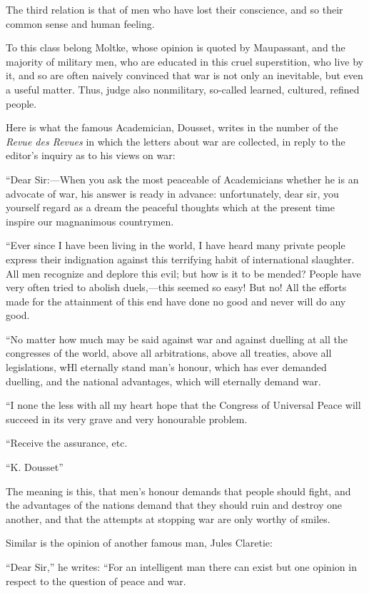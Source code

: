 \documentclass{book}
\begin{document}
The third relation is that of men who have lost their conscience, and so their common sense and human feeling.

To this class belong Moltke, whose opinion is quoted by Maupassant, and the majority of military men, who are educated in this cruel superstition, who live by it, and so are often naively convinced that war is not only an inevitable, but even a useful matter. Thus, judge also nonmilitary, so-called learned, cultured, refined people.

Here is what the famous Academician, Dousset, writes in the number of the \emph{Revue des Revues} in which the letters about war are collected, in reply to the editor’s inquiry as to his views on war:

“Dear Sir:—When you ask the most peaceable of Academicians whether he is an advocate of war, his answer is ready in advance: unfortunately, dear sir, you yourself regard as a dream the peaceful thoughts which at the present time inspire our magnanimous countrymen.

“Ever since I have been living in the world, I have heard many private people express their indignation against this terrifying habit of international slaughter. All men recognize and deplore this evil; but how is it to be mended? People have very often tried to abolish duels,—this seemed so easy! But no! All the efforts made for the attainment of this end have done no good and never will do any good.

“No matter how much may be said against war and against duelling at all the congresses of the world, above all arbitrations, above all treaties, above all legislations, wHl eternally stand man’s honour, which has ever demanded duelling, and the national advantages, which will eternally demand war.

“I none the less with all my heart hope that the Congress of Universal Peace will succeed in its very grave and very honourable problem.

“Receive the assurance, etc.

“K. Dousset”

The meaning is this, that men’s honour demands that people should fight, and the advantages of the nations demand that they should ruin and destroy one another, and that the attempts at stopping war are only worthy of smiles.

Similar is the opinion of another famous man, Jules Claretie:

“Dear Sir,” he writes: “For an intelligent man there can exist but one opinion in respect to the question of peace and war.
\end{document}
